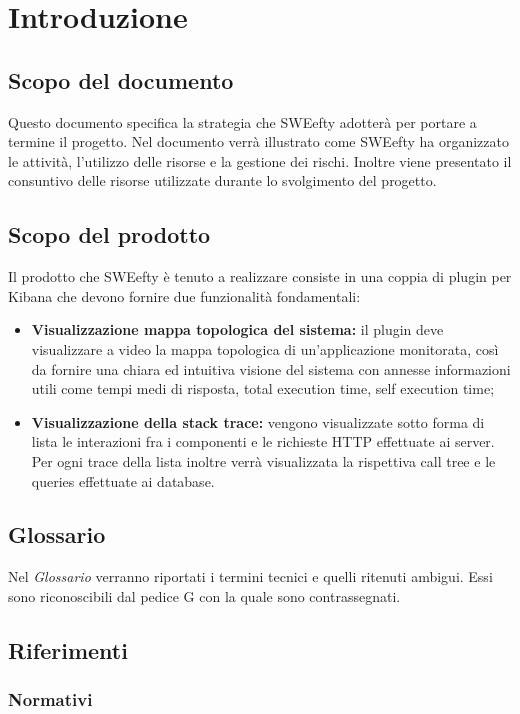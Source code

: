 
\section{Introduzione}
	\subsection{Scopo del documento}
	Questo documento specifica la strategia che SWEefty adotterà per portare a termine il progetto.
	Nel documento verrà illustrato come SWEefty ha organizzato le attività, l'utilizzo delle risorse e la gestione dei rischi.
	Inoltre viene presentato il consuntivo delle risorse utilizzate durante lo svolgimento del progetto.
	
	\subsection{Scopo del prodotto}
	Il prodotto che SWEefty è tenuto a realizzare consiste in una coppia di plugin per Kibana che devono fornire due funzionalità fondamentali:
	\begin{itemize}
		\item \textbf{Visualizzazione mappa topologica del sistema:} il plugin deve visualizzare a video la mappa topologica di un'applicazione monitorata, così da fornire una chiara ed intuitiva visione del sistema con annesse informazioni utili come tempi medi di risposta, total execution time, self execution time;
		\item \textbf{Visualizzazione della stack trace:} vengono visualizzate sotto forma di lista le  interazioni fra i componenti e le richieste HTTP effettuate ai server. Per ogni trace della lista inoltre verrà visualizzata la rispettiva call tree e le queries effettuate ai database.
	\end{itemize}

	\subsection{Glossario}
	Nel \emph{Glossario} verranno riportati i termini tecnici e quelli ritenuti ambigui. Essi sono riconoscibili dal pedice G con la quale sono contrassegnati.
	
	\subsection{Riferimenti}
			\subsubsection{Normativi}
